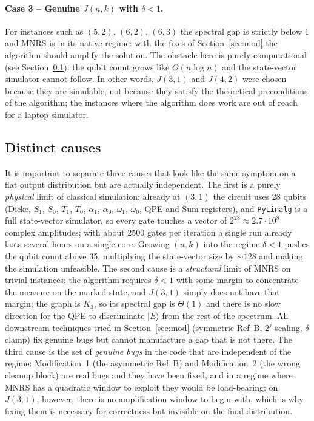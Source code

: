 \documentclass[11pt,a4paper]{article}
\begin{document}
\paragraph{Case 3 -- Genuine $J(n,k)$ with $\delta<1$.}
For instances such as $(5,2)$, $(6,2)$, $(6,3)$ the spectral gap is
strictly below $1$ and MNRS is in its native regime: with the fixes of
Section~\ref{sec:mod} the algorithm should amplify the solution. The
obstacle here is purely computational (see
Section~\ref{subsec:cause}): the qubit count grows like
$\Theta(n\log n)$ and the state-vector simulator cannot follow. In
other words, $J(3,1)$ and $J(4,2)$ were chosen because they are
simulable, not because they satisfy the theoretical preconditions of
the algorithm; the instances where the algorithm does work are out of
reach for a laptop simulator.

\subsection{Distinct causes}
\label{subsec:cause}

It is important to separate three causes that look like the same
symptom on a flat output distribution but are actually independent.
The first is a purely \emph{physical} limit of classical simulation:
already at $(3,1)$ the circuit uses 28 qubits (Dicke, $S_1$, $S_0$,
$T_1$, $T_0$, $\alpha_1$, $\alpha_0$, $\omega_1$, $\omega_0$, QPE and
Sum registers), and \texttt{PyLinalg} is a full state-vector
simulator, so every gate touches a vector of $2^{28}\approx 2.7\cdot
10^8$ complex amplitudes; with about 2500 gates per iteration a single
run already lasts several hours on a single core. Growing $(n,k)$ into
the regime $\delta<1$ pushes the qubit count above 35, multiplying the
state-vector size by $\sim 128$ and making the simulation unfeasible. The second cause is a \emph{structural} limit of MNRS on
trivial instances: the algorithm requires $\delta<1$ with some margin
to concentrate the measure on the marked state, and $J(3,1)$ simply
does not have that margin; the graph is $K_3$, so its spectral gap is
$\Theta(1)$ and there is no slow direction for the QPE to discriminate
$|E\rangle$ from the rest of the spectrum. All downstream techniques
tried in Section~\ref{sec:mod} (symmetric Ref~B, $2^j$ scaling,
$\delta$ clamp) fix genuine bugs but cannot manufacture a gap
that is not there. The third cause is the set of \emph{genuine bugs} in the
code that are independent of the regime: Modification~1 (the
asymmetric Ref~B) and Modification~2 (the wrong cleanup block) are
real bugs and they have been fixed, and in a regime where MNRS has a
quadratic window to exploit they would be load-bearing; on $J(3,1)$,
however, there is no amplification window to begin with, which is why
fixing them is necessary for correctness but invisible on the final
distribution.
\end{document}
